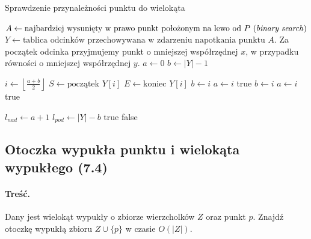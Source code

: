 \begin{algorithm}[H]
	\caption{Sprawdzenie przynależności punktu do wielokąta}
	\begin{algorithmic}[1]
			\State $A \gets \text{najbardziej wysunięty w prawo punkt położonym na lewo od $P$ (\textit{binary search})}$	
			\State $Y \gets \text{tablica odcinków przechowywana w zdarzeniu napotkania punktu $A$. }$Za początek odcinka przyjmujemy punkt o mniejszej współrzędnej $x$, w przypadku równości o mniejszej współrzędnej $y$.
			\State $a \gets 0$
			\State $b \gets |Y|-1$
			\State 
			
				\State $i \gets \left\lfloor \frac{a+b}{2} \right\rfloor$
				\State $S \gets \text{początek } Y[i]$ 
				\State $E \gets \text{koniec } Y[i]$ 
				 
					\State $b \gets i$
				 
					\State $a \gets i$
					 
						\State \Return true 
					 
						\State $b \gets i$
					 
						\State $a \gets i$
					\Else {}
						\State \Return true 
					\EndIf
				
				\EndIf    
			\EndWhile
			\State
			\State $l_{nad} \gets  a +1$
			\State $l_{pod} \gets |Y| - b$
				\State \Return true
			\EndIf
			\State
			\State \Return false
		\EndProcedure
	\end{algorithmic}
	\label{alg:Zadanie7_1}
\end{algorithm}

\subsection{Otoczka wypukła punktu i wielokąta wypukłego (7.4)}
\paragraph{Treść.} Dany jest wielokąt wypukły o zbiorze wierzcholków $Z$ oraz punkt $p$. Znajdź otoczkę wypukłą zbioru $Z \cup \{p\}$ w czasie $O(|Z|)$.

